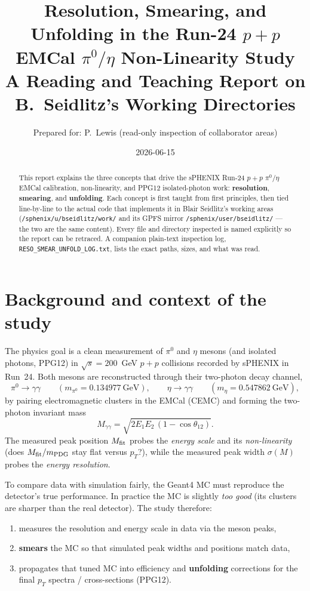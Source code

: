 \documentclass[11pt]{article}
\title{\textbf{Resolution, Smearing, and Unfolding in the Run-24 $p{+}p$\\
EMCal $\pi^0/\eta$ Non-Linearity Study}\\[4pt]
\large A Reading and Teaching Report on B.~Seidlitz's Working Directories}
\author{Prepared for: P.~Lewis \quad (read-only inspection of collaborator areas)}
\date{2026-06-15}
\newcommand{\pp}[1]{\textcolor{pathcol}{\texttt{#1}}}
\begin{document}
\maketitle

\begin{abstract}
This report explains the three concepts that drive the sPHENIX Run-24 $p{+}p$
$\pi^0/\eta$ EMCal calibration, non-linearity, and PPG12 isolated-photon work:
\textbf{resolution}, \textbf{smearing}, and \textbf{unfolding}. Each concept is
first taught from first principles, then tied line-by-line to the actual code
that implements it in Blair Seidlitz's working areas
(\pp{/sphenix/u/bseidlitz/work/} and its GPFS mirror
\pp{/sphenix/user/bseidlitz/} --- the two are the same content). Every file and
directory inspected is named explicitly so the report can be retraced. A
companion plain-text inspection log, \texttt{RESO\_SMEAR\_UNFOLD\_LOG.txt},
lists the exact paths, sizes, and what was read.
\end{abstract}

\tableofcontents

\section{Background and context of the study}

The physics goal is a clean measurement of $\pi^0$ and $\eta$ mesons (and
isolated photons, PPG12) in $\sqrt{s}=200$~GeV $p{+}p$ collisions recorded by
sPHENIX in Run~24. Both mesons are reconstructed through their two-photon decay
channel,
\[
  \pi^0 \to \gamma\gamma \qquad (m_{\pi^0}=0.134977~\text{GeV}),\qquad
  \eta  \to \gamma\gamma \qquad (m_{\eta}=0.547862~\text{GeV}),
\]
by pairing electromagnetic clusters in the EMCal (CEMC) and forming the
two-photon invariant mass
\[
  M_{\gamma\gamma}=\sqrt{2E_1E_2\,(1-\cos\theta_{12})}.
\]
The measured peak position $M_{\rm fit}$ probes the \emph{energy scale} and its
\emph{non-linearity} (does $M_{\rm fit}/m_{\rm PDG}$ stay flat versus $p_T$?),
while the measured peak width $\sigma(M)$ probes the \emph{energy resolution}.

To compare data with simulation fairly, the Geant4 MC must reproduce the
detector's true performance. In practice the MC is slightly \emph{too good}
(its clusters are sharper than the real detector). The study therefore:
\begin{enumerate}[nosep]
  \item measures the resolution and energy scale in data via the meson peaks,
  \item \textbf{smears} the MC so that simulated peak widths and positions match
        data,
  \item propagates that tuned MC into efficiency and \textbf{unfolding}
        corrections for the final $p_T$ spectra / cross-sections (PPG12).
\end{enumerate}
\end{document}
